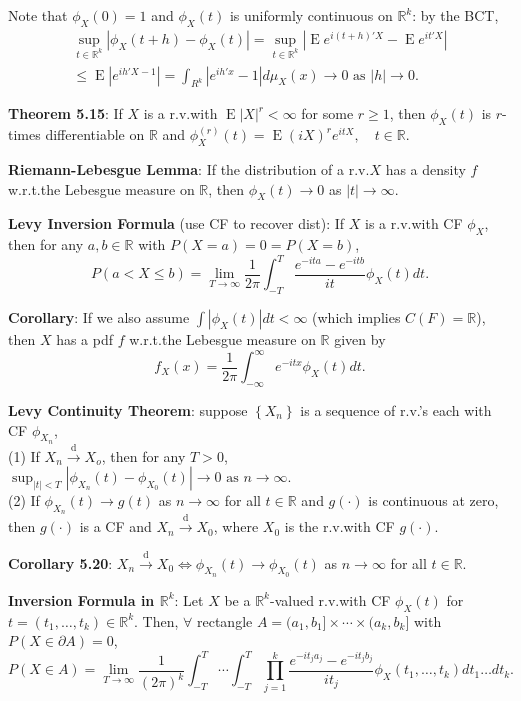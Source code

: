 \documentclass[paper=letter,fontsize=2.89mm]{scrartcl}
\DeclareMathOperator{\E}{E}
\newcommand{\convdist}{\stackrel{\text{d}}{\longrightarrow}}
\newcommand{\R}{\mathbb{R}}
\newcommand\abs[1]{\left| #1 \right|}
\newcommand\set[1]{\left\{ #1 \right\}}
\begin{document}
\begin{multicols*}{3}
Note that $\phi_X(0) = 1$ and $\phi_X(t)$ is uniformly continuous on $\R^k$: by the BCT,
\begin{align*}
\sup_{t\in\R^k} \abs{\phi_X(t+h) - \phi_X(t)}
=  \sup_{t\in\R^k} \abs{\E e^{i(t+h)'X} - \E e^{it'X}} \\
\le \E \abs{e^{ih'X - 1}} 
= \int_{R^k} \abs{e^{ih'x} - 1} d\mu_X(x) \to 0 \text{ as } \abs{h} \to 0.
\end{align*}

\textbf{Theorem 5.15}: If $X$ is a r.v.\@ with $\E \abs{X}^r < \infty$ for some $r \ge 1$, then $\phi_X(t)$ is $r$-times differentiable on $\R$ and
$\phi^{(r)}_X(t) = \E (iX)^r e^{itX}, \quad t \in \R.$ \\ \medskip

\textbf{Riemann-Lebesgue Lemma}: If the distribution of a r.v.\@ $X$ has a density $f$ w.r.t.\@ the Lebesgue measure on $\R$, then $\phi_X(t) \to 0$ as $\abs{t} \to \infty$. \\ \medskip

\textbf{Levy Inversion Formula} (use CF to recover dist): If $X$ is a r.v.\@ with CF $\phi_X$, then for any $a,b \in \R$ with $P(X = a) = 0 = P(X = b)$,
$$P(a < X \le b) = \lim_{T\to\infty} \frac{1}{2\pi} \int_{-T}^T \frac{e^{-ita} - e^{-itb}}{it}\phi_X(t)dt.$$

\textbf{Corollary}: If we also assume $\int \abs{\phi_X(t)}dt<\infty$ (which implies $C(F) = \R$), then $X$ has a pdf $f$ w.r.t.\@ the Lebesgue measure on $\R$ given by
$$f_X(x) = \frac{1}{2\pi} \int_{-\infty}^\infty e^{-itx}\phi_X(t)dt.$$

\textbf{Levy Continuity Theorem}: suppose $\set{X_n}$ is a sequence of r.v.'s each with CF $\phi_{X_n}$, \\
(1) If $X_n \convdist X_o$, then for any $T > 0$, $\sup_{\abs{t} < T} \abs{\phi_{X_n}(t) - \phi_{X_0}(t)} \to 0 \text{ as } n \to \infty.$ \\ 
(2) If $\phi_{X_n}(t) \to g(t)$ as $n \to \infty$ for all $t \in \R$ and $g(\cdot)$ is continuous at zero, then $g(\cdot)$ is a CF and $X_n \convdist X_0$, where $X_0$ is the r.v.\@ with CF $g(\cdot)$. \\ \medskip

\textbf{Corollary 5.20}: $X_n \convdist X_0 \iff \phi_{X_n}(t) \to \phi_{X_0}(t)$ as $n \to \infty$ for all $t \in \R$. \\ \medskip

\textbf{Inversion Formula in $\R^k$}: Let $X$ be a $\R^k$-valued r.v.\@ with CF $\phi_X(t)$ for $t = (t_1, \dots, t_k) \in \R^k$. Then, $\forall$ rectangle $A = (a_1, b_1] \times \cdots \times (a_k, b_k]$ with $P(X \in \partial A) = 0$,
$$P(X \in A) = \lim_{T\to\infty} \frac{1}{(2\pi)^k} \int_{-T}^T \cdots \int_{-T}^T \prod_{j=1}^k
\frac{e^{-it_ja_j} - e^{-it_jb_j}}{it_j} \phi_X(t_1, \dots, t_k)dt_1\dots dt_k.$$


\end{multicols*}
\end{document}
